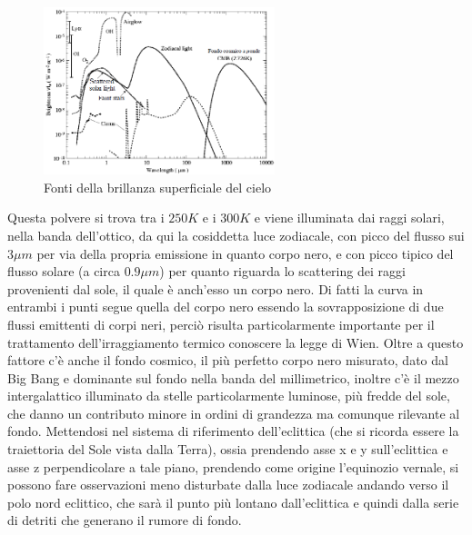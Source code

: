 \documentclass[a4paper,twoside,openany,notitlepage]{book}
\theoremstyle{definition}
\theoremstyle{plain}
\begin{document}
\begin{figure}[h]
	\centering
	\includegraphics[width=0.6\textwidth]{./Immagini/Capitolo1/brillanza_sup_cielo.png}
	\caption*{Fonti della brillanza superficiale del cielo}
\end{figure}

Questa polvere si trova tra i $250K$ e i $300K$ e viene illuminata dai raggi solari, nella banda dell'ottico, da qui la cosiddetta luce zodiacale, con picco del flusso sui $3\mu m$ per via della propria emissione in quanto corpo nero, e con picco tipico del flusso solare (a circa $0.9\mu m$) per quanto riguarda lo scattering dei raggi provenienti dal sole, il quale è anch'esso un corpo nero. Di fatti la curva in entrambi i punti segue quella del corpo nero essendo la sovrapposizione di due flussi emittenti di corpi neri, perciò risulta particolarmente importante per il trattamento dell'irraggiamento termico conoscere la legge di Wien. Oltre a questo fattore c'è anche il fondo cosmico, il più perfetto corpo nero misurato, dato dal Big Bang e dominante sul fondo nella banda del millimetrico, inoltre c'è il mezzo intergalattico illuminato da stelle particolarmente luminose, più fredde del sole, che danno un contributo minore in ordini di grandezza ma comunque rilevante al fondo. Mettendosi nel sistema di riferimento dell'eclittica (che si ricorda essere la traiettoria del Sole vista dalla Terra), ossia prendendo asse x e y sull'eclittica e asse z perpendicolare a tale piano, prendendo come origine l'equinozio vernale, si possono fare osservazioni meno disturbate dalla luce zodiacale andando verso il polo nord eclittico, che sarà il punto più lontano dall'eclittica e quindi dalla serie di detriti che generano il rumore di fondo.
\end{document}
